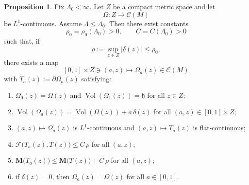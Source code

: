 \documentclass[12pt,english]{article}
\theoremstyle{definition}
\newtheorem{proposition}[theorem]{Proposition}
\begin{document}
\begin{proposition}
\label{prop:continuous_correction_lifted}
Fix $\Lambda_0<\infty$. Let $Z$ be a compact metric space and let
\[
\Omega:Z\to \mathcal C(M)
\]
be $L^1$-continuous. Assume $\Lambda\le \Lambda_0$. Then there exist constants
\[
\rho_0=\rho_0(\Lambda_0)>0,
\qquad
C=C(\Lambda_0)>0
\]
such that, if
\[
\rho:=\sup_{z\in Z}|\delta(z)|\le \rho_0,
\]
there exists a map
\[
[0,1]\times Z\ni (a,z)\longmapsto \Omega_a(z)\in \mathcal C(M)
\]
with $T_a(z):=\partial\Omega_a(z)$ satisfying:
\begin{enumerate}
\item[(i)] $\Omega_0(z)=\Omega(z)$ and $\operatorname{Vol}(\Omega_1(z))=\mathfrak h$ for all $z\in Z$;
\item[(ii)] $\operatorname{Vol}(\Omega_a(z))=\operatorname{Vol}(\Omega(z))+a\,\delta(z)$ for all $(a,z)\in[0,1]\times Z$;
\item[(iii)] $(a,z)\mapsto \Omega_a(z)$ is $L^1$-continuous and $(a,z)\mapsto T_a(z)$ is flat-continuous;
\item[(iv)] $\mathcal F\bigl(T_a(z),T(z)\bigr)\le C\,\rho$ for all $(a,z)$;
\item[(v)] $\mathbf M\bigl(T_a(z)\bigr)\le \mathbf M\bigl(T(z)\bigr)+C\,\rho$ for all $(a,z)$;
\item[(vi)] if $\delta(z)=0$, then $\Omega_a(z)=\Omega(z)$ for all $a\in[0,1]$.
\end{enumerate}
\end{proposition}
\end{document}
